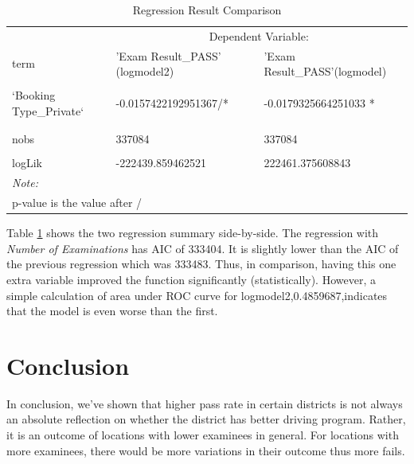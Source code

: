\documentclass[11pt,a4paper,]{article}
\begin{document}
\begin{table}[!h]

\caption{\label{tab:comparison}Regression Result Comparison}
\centering
\begin{tabular}[t]{lll}
\toprule
\multicolumn{1}{c}{ } & \multicolumn{2}{c}{Dependent Variable:} \\
\cmidrule(l{3pt}r{3pt}){2-3}
term & 'Exam Result\_PASS' (logmodel2) & 'Exam Result\_PASS'(logmodel)\\
\midrule
\cellcolor{gray!6}{(Intercept)} & \cellcolor{gray!6}{0.522573474570028/***} & \cellcolor{gray!6}{0.533407196218835 ***}\\
`Booking Type\_Private` & -0.0157422192951367/* & -0.0179325664251033 *\\
\addlinespace[0.3em]
\multicolumn{3}{l}{\textbf{ }}\\
\cellcolor{gray!6}{\hspace{1em}`Number of Examinations`} & \cellcolor{gray!6}{0.00169271410738006/***} & \cellcolor{gray!6}{}\\
\hspace{1em}nobs & 337084 & 337084\\
\cellcolor{gray!6}{\hspace{1em}AIC} & \cellcolor{gray!6}{444885.718925042} & \cellcolor{gray!6}{444926.751217685}\\
logLik & -222439.859462521 & 222461.375608843\\
\bottomrule
\multicolumn{3}{l}{\rule{0pt}{1em}\textit{Note: }}\\
\multicolumn{3}{l}{\rule{0pt}{1em}p-value is the value after /}\\
\end{tabular}
\end{table}

Table \ref{tab:comparison} shows the two regression summary side-by-side. The regression with \emph{Number of Examinations} has AIC of 333404. It is slightly lower than the AIC of the previous regression which was 333483. Thus, in comparison, having this one extra variable improved the function significantly (statistically). However, a simple calculation of area under ROC curve for logmodel2,0.4859687,indicates that the model is even worse than the first.

\section*{Conclusion}

In conclusion, we've shown that higher pass rate in certain districts is not always an absolute reflection on whether the district has better driving program. Rather, it is an outcome of locations with lower examinees in general. For locations with more examinees, there would be more variations in their outcome thus more fails.
\end{document}
